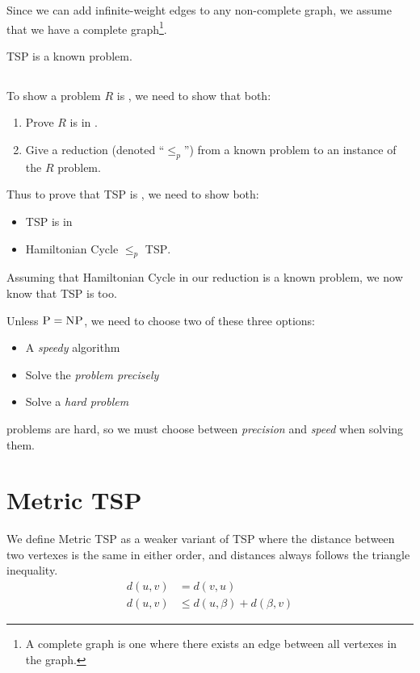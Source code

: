                Since we can add infinite-weight edges to any non-complete graph, we assume that we have a complete graph\footnote{A complete graph is one where there exists an edge between all vertexes in the graph.}.

                \textsc{TSP} is a known \npcomplete problem.
            \subsection{\npcomplete} %
            \label{sub:npcomplete}
                To show a problem $R$ is \npcomplete, we need to show that both:
                \begin{enumerate}
                    \item Prove $R$ is in \np.
                    \item Give a reduction (denoted ``$\le_p$'') from a known \npcomplete problem to an instance of the $R$ problem.
                \end{enumerate}
                Thus to prove that \textsc{TSP} is \npcomplete, we need to show both:
                \begin{itemize}
                    \item \textsc{TSP} is in \np
                    \item Hamiltonian Cycle $\le_p$ \textsc{TSP}.
                \end{itemize}
                Assuming that Hamiltonian Cycle in our reduction is a known \npcomplete problem, we now know that \textsc{TSP} is \npcomplete too.

                Unless $\textsc{P} = \textsc{NP}$, we need to choose two of these three options:
                \begin{itemize}
                    \item A \textit{speedy} algorithm
                    \item Solve the \textit{problem precisely}
                    \item Solve a \textit{hard problem}
                \end{itemize}
                \npcomplete problems are hard, so we must choose between \emph{precision} and \emph{speed} when solving them.
            \section{Metric \textsc{TSP}} %
            \label{sec:metric_tsp}
                We define Metric \textsc{TSP} as a weaker variant of \textsc{TSP} where the distance between two vertexes is the same in either order, and distances always follows the triangle inequality.
                \begin{align*}
                    d(u, v) &=   d(v, u) \\
                    d(u, v) &\le d(u, \beta) + d(\beta, v)
                \end{align*}

